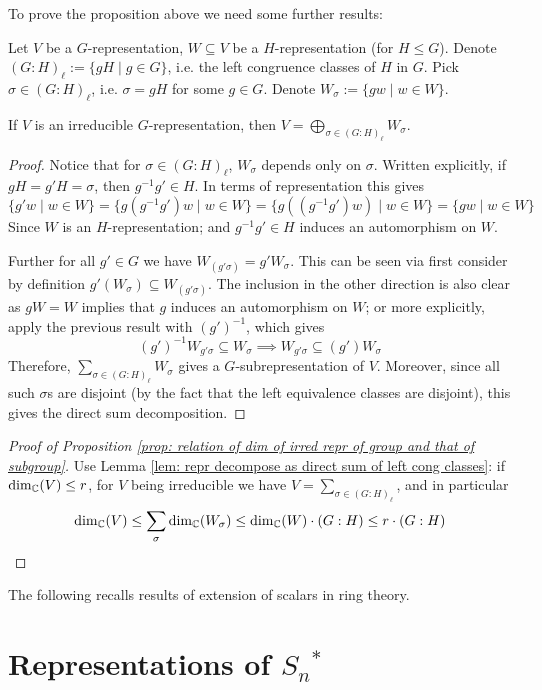 \documentclass{article}
\begin{document}
\textstart
To prove the proposition above we need some further results:

\begin{lemma}\label{lem: repr decompose as direct sum of left cong classes}
    Let $V$ be a $G$-representation, $W \subseteq V$ be a $H$-representation (for $H \leq G$). Denote $(G : H)_{\ell} := \{gH \mid g \in G\}$, i.e. the left congruence classes of $H$ in $G$. Pick $\sigma \in (G : H)_{\ell}$, i.e. $\sigma = gH$ for some $g \in G$. Denote $W_{\sigma} := \{ gw \mid w \in W \}$.

    If $V$ is an irreducible $G$-representation, then $V = \bigoplus_{\sigma \in (G : H)_{\ell}} W_{\sigma}$.
\end{lemma}

\begin{proof}
    Notice that for $\sigma \in (G : H)_{\ell}$, $W_{\sigma}$ depends only on $\sigma$. Written explicitly, if $gH = g'H = \sigma$, then $g^{-1} g' \in H$. In terms of representation this gives
    \[
        \{ g' w \mid w \in W \} = \{ g (g^{-1} g')w \mid w \in W \} = \{ g((g^{-1} g') w) \mid w \in W \} = \{ gw \mid w \in W \}
    \]
    Since $W$ is an $H$-representation; and $g^{-1} g' \in H$ induces an automorphism on $W$.

    Further for all $g' \in G$ we have $W_{(g' \sigma)} = g' W_{\sigma}$. This can be seen via first consider by definition $g'(W_{\sigma}) \subseteq W_{(g' \sigma)}$. The inclusion in the other direction is also clear as $gW = W$ implies that $g$ induces an automorphism on $W$; or more explicitly, apply the previous result with $(g')^{-1}$, which gives
    \[
        (g')^{-1} W_{g' \sigma} \subseteq W_{\sigma} \implies W_{g' \sigma} \subseteq (g') W_{\sigma}
    \]
    Therefore, $\sum_{\sigma \in (G : H)_{\ell}} W_{\sigma}$ gives a $G$-subrepresentation of $V$. Moreover, since all such $\sigma$s are disjoint (by the fact that the left equivalence classes are disjoint), this gives the direct sum decomposition.
\end{proof}

\begin{proof}[Proof of Proposition \ref{prop: relation of dim of irred repr of group and that of subgroup}]
    Use Lemma \ref{lem: repr decompose as direct sum of left cong classes}: if $\dim_{\mathbb{C}}(V) \leq r$, for $V$ being irreducible we have $V = \sum_{\sigma \in (G : H)_{\ell}}$, and in particular
    \[
        \dim_{\mathbb{C}}(V) \leq \sum_{\sigma} \dim_{\mathbb{C}}(W_{\sigma}) \leq \dim_{\mathbb{C}}(W) \cdot (G : H) \leq r \cdot (G : H)
    \]
\end{proof}

\textstart
The following recalls results of extension of scalars in ring theory. 

\section{Representations of $S_n$$^{\ast}$}
\end{document}
